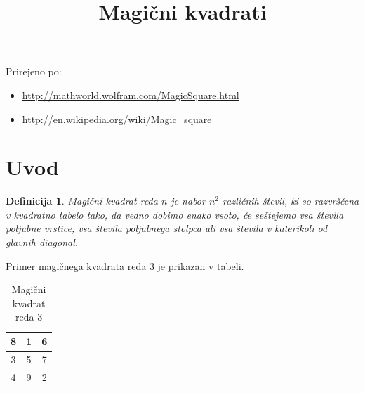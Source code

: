 \documentclass[a4paper,12pt]{article}
\title{Magični kvadrati}
\date{}
\newtheorem{definicija}{Definicija}
\begin{document}
\maketitle

Prirejeno po:

\begin{itemize}
   \item \url{http://mathworld.wolfram.com/MagicSquare.html}
   \item \url{http://en.wikipedia.org/wiki/Magic_square}
\end{itemize}


\tableofcontents


\newpage

\section{Uvod}

 \begin{definicija}
   \emph{Magični kvadrat} reda \(n\) je nabor \(n^2\) različnih števil,
   ki so razvrščena v kvadratno tabelo tako, da vedno dobimo enako vsoto,
   če seštejemo vsa števila poljubne vrstice, vsa števila poljubnega
   stolpca ali vsa števila v katerikoli od glavnih diagonal.
 \end{definicija}

Primer magičnega kvadrata reda 3 je prikazan v tabeli. %
\begin{table}[!ht] 
     \centering
     \label{table:mag3}
     \caption{Magični kvadrat reda 3}
\begin{tabular}{|c|c|c|}
   \hline
8 & 1 & 6 \\
   \hline
3 & 5 & 7 \\
   \hline
4 & 9 & 2 \\
   \hline
\end{tabular}
\end{table}
   
\end{document}
